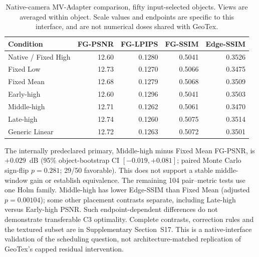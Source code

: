 \documentclass[times,twocolumn,final]{elsarticle}
\providecommand{\DIFadd}[1]{{\protect\color{blue} \sf #1}} %
\providecommand{\DIFaddbegin}{} %
\providecommand{\DIFaddend}{} %
\providecommand{\DIFaddFL}[1]{\DIFadd{#1}} %
\providecommand{\DIFaddbeginFL}{\DIFaddbegin} %
\providecommand{\DIFaddendFL}{\DIFaddend} %
\renewcommand{\DIFaddbeginFL}{}
\renewcommand{\DIFaddendFL}{}
\renewcommand{\DIFaddFL}[1]{#1}
\begin{document}
  \DIFaddbeginFL \begin{table}[ht]\DIFaddendFL \centering  \DIFaddbeginFL \scriptsize
\caption{Native-camera MV-Adapter comparison, fifty input-selected objects. Views are averaged within object. Scale values and endpoints are specific to this interface, and are not numerical doses shared with GeoTex.}\label{tab:new-mva}
\begin{tabular}{lrrrr}
\DIFaddendFL \toprule   \DIFaddbeginFL \DIFaddFL{Condition }\DIFaddendFL &   \DIFaddbeginFL \DIFaddFL{FG-PSNR }\DIFaddendFL &   \DIFaddbeginFL \DIFaddFL{FG-LPIPS }\DIFaddendFL &   \DIFaddbeginFL \DIFaddFL{FG-SSIM }& \DIFaddFL{Edge-SSIM }\DIFaddendFL \\
\midrule
  \DIFaddbeginFL \DIFaddFL{Native / Fixed High }\DIFaddendFL &   \DIFaddbeginFL \DIFaddFL{12.60 }\DIFaddendFL &   \DIFaddbeginFL \DIFaddFL{0.1280 }\DIFaddendFL &   \DIFaddbeginFL \DIFaddFL{0.5041 }& \DIFaddFL{0.3526 }\DIFaddendFL \\
  \DIFaddbeginFL \DIFaddFL{Fixed Low }\DIFaddendFL &   \DIFaddbeginFL \DIFaddFL{12.73 }\DIFaddendFL &   \DIFaddbeginFL \DIFaddFL{0.1270 }\DIFaddendFL &   \DIFaddbeginFL \DIFaddFL{0.5066 }& \DIFaddFL{0.3475 }\DIFaddendFL \\
  \DIFaddbeginFL \DIFaddFL{Fixed Mean }\DIFaddendFL &   \DIFaddbeginFL \DIFaddFL{12.68 }\DIFaddendFL &   \DIFaddbeginFL \DIFaddFL{0.1279 }\DIFaddendFL &   \DIFaddbeginFL \DIFaddFL{0.5068 }& \DIFaddFL{0.3509 }\\
\DIFaddFL{Early-high }& \DIFaddFL{12.60 }& \DIFaddFL{0.1296 }& \DIFaddFL{0.5041 }& \DIFaddFL{0.3503 }\\
\DIFaddFL{Middle-high }& \DIFaddFL{12.71 }& \DIFaddFL{0.1262 }& \DIFaddFL{0.5061 }& \DIFaddFL{0.3470 }\\
\DIFaddFL{Late-high }& \DIFaddFL{12.74 }& \DIFaddFL{0.1260 }& \DIFaddFL{0.5075 }& \DIFaddFL{0.3514 }\\
\DIFaddFL{Generic Linear }& \DIFaddFL{12.72 }& \DIFaddFL{0.1263 }& \DIFaddFL{0.5072 }& \DIFaddFL{0.3501 }\DIFaddendFL \\
\bottomrule\end{tabular}\end{table}

  \DIFaddbegin \DIFadd{The internally predeclared primary, Middle-high minus Fixed Mean FG-PSNR, is $+0.029$~dB (95\% object-bootstrap CI $[-0.019,+0.081]$; paired Monte Carlo sign-flip $p=0.281$; 29/}\DIFaddend 50   \DIFaddbegin \DIFadd{favorable). This does not support a stable middle-window gain or establish equivalence. The remaining 104 pair--metric tests use one Holm family. Middle-high has lower Edge-SSIM than Fixed Mean (adjusted $p=0.00104$); some other placement contrasts separate, including Late-high versus Early-high PSNR. Such endpoint-dependent differences do not demonstrate transferable }\DIFaddend C3   \DIFaddbegin \DIFadd{optimality. Complete contrasts, correction rules and the textured subset are in Supplementary Section~S17. This is a native-interface validation of the scheduling question, not architecture-matched replication of GeoTex's capped residual intervention}\DIFaddend .
\end{document}
